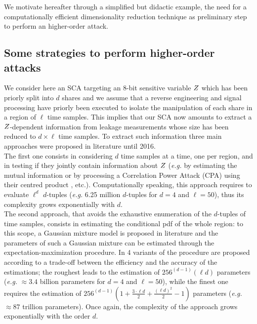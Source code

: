 We motivate hereafter through a simplified but didactic  example, the need for a computationally efficient dimensionality reduction technique as preliminary step to perform an higher-order attack.


\subsection{Some strategies to perform higher-order attacks}\label{sec:example}
We consider here an SCA targeting an $8$-bit sensitive variable $Z$ which has been priorly split into $d$ shares and we assume that a reverse engineering and signal processing have priorly been executed to isolate the manipulation of each share  in a region of $\ell$ time samples. This implies that our SCA  now amounts to extract a $Z$-dependent information from leakage measurements whose size has been reduced to $d\times \ell$ time samples. To extract such information three main approaches were proposed in literature until 2016.\\

The first one consists in considering $d$ time samples  at a time, one per region, and in testing if they jointly contain information about $Z$ (\emph{e.g.} by estimating the mutual information  \cite{Reparaz2012} or by processing a Correlation Power Attack (CPA) using their centred product \cite{chari1999towards}, etc.). Computationally speaking, this approach requires to evaluate $\ell^d$ $d$-tuples (\emph{e.g.} 6.25 million $d$-tuples for $d=4$ and $\ell=50$), thus its complexity grows exponentially with $d$. \\

The second approach, that avoids the exhaustive enumeration of the $d$-tuples of time samples, consists in estimating the conditional pdf of the whole region: 
to this scope, a Gaussian mixture model is proposed in literature \cite{lemke2007gaussian,Lomne2014} and the parameters of such a Gaussian mixture can be estimated through the expectation-maximization procedure. In \cite{lemke2007gaussian} 4 variants of the procedure are proposed according to a trade-off between the efficiency and the accuracy of the estimations;  the roughest leads to the estimation of  $256^{(d-1)}(\ell d)$  parameters (\emph{e.g.} $\approx 3.4 $ billion parameters for $d=4$ and $\ell=50$), while the finest one requires the estimation of $256^{(d-1)}(1 + \frac{3\cdot \ell d}{2} + \frac{(\ell d)^2}{2}-1)$ parameters (\emph{e.g.} $\approx 87$ trillion parameters). Once again, the complexity of the approach grows exponentially with the order $d$.\\

